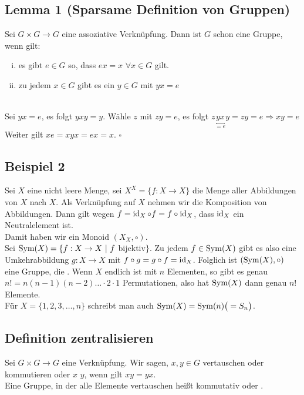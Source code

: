 \subsection{Lemma 1 (Sparsame Definition von Gruppen)}
\label{sub:lemma_1}
Sei $G \times G \to G$ eine assoziative Verknüpfung. Dann ist $G$ schon eine Gruppe, wenn gilt:
\begin{enumerate}[(i)]
	\item es gibt $e \in G$ so, dass $ex=x$ $\forall x \in G$ gilt.
	\item zu jedem $x\in G$ gibt es ein $y \in G$ mit $ yx=e$
\end{enumerate}
\\
Sei $yx=e$, es folgt $yxy=y$. Wähle $z$ mit $zy=e$, es folgt $z\underbracket{yx}_{=e}y=zy=e \Rightarrow xy=e$\\
Weiter gilt $xe=xyx=ex=x$.
\hfill $\square$

\subsection{Beispiel 2}
\label{sub: beispiel_2}
Sei $X$ eine nicht leere Menge, sei $X^X=\{f : X \to X\}$ die Menge aller Abbildungen von $X$ nach $X$. Als Verknüpfung auf $X$ nehmen wir die Komposition von Abbildungen. Dann gilt wegen $f=\operatorname{id}_X \circ f= f \circ \operatorname{id}_X$, dass $\operatorname{id}_X$ ein Neutralelement ist.\\
Damit haben wir ein Monoid $(X_X, \circ )$.\\
Sei $\operatorname{Sym}(X)=\{f:X\to X~|~f$ bijektiv$\}$. Zu jedem $f\in \operatorname{Sym}(X)$ gibt es also eine Umkehrabbildung $g:X\to X$ mit $f \circ g=g\circ f=\operatorname{id}_X$. Folglich ist $(\operatorname{Sym}(X), \circ)$ eine Gruppe, die . Wenn $X$ endlich ist mit $n$ Elementen, so gibt es genau $n!=n(n-1)(n-2)\dots \cdot 2\cdot 1$ Permutationen, also hat $\operatorname{Sym}(X)$ dann genau $n!$ Elemente.\\
Für $X=\{1,2,3,\dots,n\}$ schreibt man auch $\operatorname{Sym}(X)=\operatorname{Sym}(n)\big( =S_n \big)$.

\subsection{Definition zentralisieren}
\label{sub:def_zentralisieren}
Sei $G \times G \to G$ eine Verknüpfung. Wir sagen, $x,y \in G$ vertauschen oder kommutieren oder $x$  $y$, wenn gilt $xy=yx$.\\
Eine Gruppe, in der alle Elemente vertauschen heißt kommutativ oder . 

